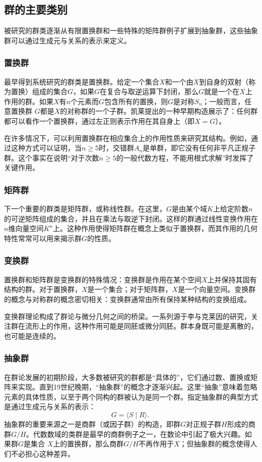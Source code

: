 \subsection{群的主要类别}
被研究的群类逐渐从有限置换群和一些特殊的矩阵群例子扩展到抽象群，这些抽象群可以通过生成元与关系的表示来定义。
\subsubsection{置换群}
最早得到系统研究的群类是置换群。给定一个集合$X$和一个由$X$到自身的双射（称为置换）组成的集合$G$，如果$G$在复合与取逆运算下封闭，那么$G$就是一个在$X$上作用的群。如果$X$有$n$个元素而$G$包含所有的置换，则$G$是对称$S_n$；一般而言，任意置换群 $G$都是$X$的对称群的一个子群。凯莱提出的一种早期构造展示了：任何群都可以看作一个置换群，通过左正则表示作用在其自身上（即$X = G$）。

在许多情况下，可以利用置换群在相应集合上的作用性质来研究其结构。例如，通过这种方式可以证明，当$n \geq 5$时，交错群$A_n$是单群，即它没有任何非平凡正规子群。这个事实在说明“对于次数$n \geq 5$的一般代数方程，不能用根式求解”时发挥了关键作用。
\subsubsection{矩阵群}
下一个重要的群类是矩阵群，或称线性群。在这里，$G$是由某个域$K$上给定阶数$n$的可逆矩阵组成的集合，并且在乘法与取逆下封闭。这样的群通过线性变换作用在$n$维向量空间$K^n$上。这种作用使得矩阵群在概念上类似于置换群，而其作用的几何特性常常可以用来揭示群$G$的性质。
\subsubsection{变换群}
置换群和矩阵群是变换群的特殊情况：变换群是作用在某个空间$X$上并保持其固有结构的群。对于置换群，$X$是一个集合；对于矩阵群，$X$是一个向量空间。变换群的概念与对称群的概念密切相关：变换群通常由所有保持某种结构的变换组成。

变换群理论构成了群论与微分几何之间的桥梁。一系列源于李与克莱因的研究，关注群在流形上的作用，这种作用可能是同胚或微分同胚。群本身既可能是离散的，也可能是连续的。
\subsubsection{抽象群}
在群论发展的初期阶段，大多数被研究的群都是“具体的”，它们通过数、置换或矩阵来实现。直到19世纪晚期，“抽象群”的概念才逐渐兴起。这里“抽象”意味着忽略元素的具体性质，以至于两个同构的群被认为是同一个群。指定抽象群的典型方式是通过生成元与关系的表示：
$$
G = \langle S \mid R \rangle .~
$$
抽象群的重要来源之一是商群（或因子群）的构造，即群$G$对正规子群$H$形成的商群$G/H$。代数数域的类群是最早的商群例子之一，在数论中引起了极大兴趣。如果群$G$是集合 $X$上的置换群，那么商群$G/H$不再作用于$X$；但抽象群的概念使得人们不必担心这种差异。

